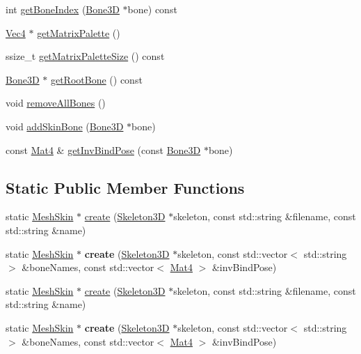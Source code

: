\begin{DoxyCompactItemize}
\item 
int \hyperlink{classMeshSkin_a79b2269d85ee8b9cda3e35126cda511f}{get\+Bone\+Index} (\hyperlink{classBone3D}{Bone3D} $\ast$bone) const
\item 
\hyperlink{classVec4}{Vec4} $\ast$ \hyperlink{classMeshSkin_a69c550cdf8ed656c6faaa4ad912ddad6}{get\+Matrix\+Palette} ()
\item 
ssize\+\_\+t \hyperlink{classMeshSkin_a34c91f249fdec320a2a3243ce7a184c9}{get\+Matrix\+Palette\+Size} () const
\item 
\hyperlink{classBone3D}{Bone3D} $\ast$ \hyperlink{classMeshSkin_a9741f7732d958d7b98b04907f5a20fb8}{get\+Root\+Bone} () const
\item 
void \hyperlink{classMeshSkin_add548f76d7d93110413d5da980c9efb0}{remove\+All\+Bones} ()
\item 
void \hyperlink{classMeshSkin_a64945183efaca64d7b7fdd9c74262ed1}{add\+Skin\+Bone} (\hyperlink{classBone3D}{Bone3D} $\ast$bone)
\item 
const \hyperlink{classMat4}{Mat4} \& \hyperlink{classMeshSkin_a9d8ba78b228c94ba4a4e62ff80818164}{get\+Inv\+Bind\+Pose} (const \hyperlink{classBone3D}{Bone3D} $\ast$bone)
\end{DoxyCompactItemize}
\subsection*{Static Public Member Functions}
\begin{DoxyCompactItemize}
\item 
static \hyperlink{classMeshSkin}{Mesh\+Skin} $\ast$ \hyperlink{classMeshSkin_aa4f6d9cc6de56a6b5c0710ae9f83f9a7}{create} (\hyperlink{classSkeleton3D}{Skeleton3D} $\ast$skeleton, const std\+::string \&filename, const std\+::string \&name)
\item 
\mbox{\label{classMeshSkin_ad2eb8ee58c162ee37ee768a5906eaf52}} 
static \hyperlink{classMeshSkin}{Mesh\+Skin} $\ast$ {\bfseries create} (\hyperlink{classSkeleton3D}{Skeleton3D} $\ast$skeleton, const std\+::vector$<$ std\+::string $>$ \&bone\+Names, const std\+::vector$<$ \hyperlink{classMat4}{Mat4} $>$ \&inv\+Bind\+Pose)
\item 
static \hyperlink{classMeshSkin}{Mesh\+Skin} $\ast$ \hyperlink{classMeshSkin_aa4f6d9cc6de56a6b5c0710ae9f83f9a7}{create} (\hyperlink{classSkeleton3D}{Skeleton3D} $\ast$skeleton, const std\+::string \&filename, const std\+::string \&name)
\item 
\mbox{\label{classMeshSkin_aded1c13cf98c18896b0a79920b6d110f}} 
static \hyperlink{classMeshSkin}{Mesh\+Skin} $\ast$ {\bfseries create} (\hyperlink{classSkeleton3D}{Skeleton3D} $\ast$skeleton, const std\+::vector$<$ std\+::string $>$ \&bone\+Names, const std\+::vector$<$ \hyperlink{classMat4}{Mat4} $>$ \&inv\+Bind\+Pose)
\end{DoxyCompactItemize}
